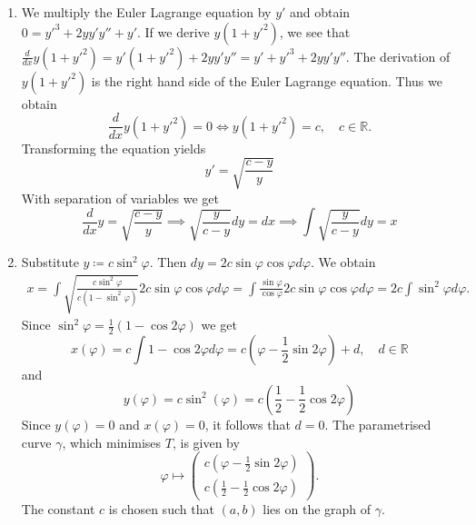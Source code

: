 \documentclass[a4paper]{article}
\theoremstyle{plain}
\begin{document}
\begin{enumerate}[label=(\alph*)]
	
	\item We multiply the Euler Lagrange equation by $y'$ and obtain $0=y'^3 + 2yy'y'' + y'$. If we derive $y(1+y'^2)$, we see that $\frac{d}{dx}y(1+y'^2) = y'(1+y'^2) + 2yy'y'' = y' + y'^3  + 2yy'y''$. The derivation of $y(1+y'^2)$ is the right hand side of the Euler Lagrange equation. Thus we obtain
	\[
		\frac{d}{dx} y(1+y'^2) = 0 \iff y(1+y'^2) = c, \quad c \in \mathbb R.
	\]
	Transforming the equation yields
	\[
		y' = \sqrt{\frac{c-y}{y}}
	\]
	With separation of variables we get
	\[
		\frac{d}{dx}y = \sqrt{\frac{c-y}{y}} \implies \sqrt{\frac{y}{c-y}} dy = dx \implies \int \sqrt{\frac{y}{c-y}}dy = x
	\]
	
	\item Substitute $y \coloneqq c \sin^2\varphi$. Then $dy = 2c\sin\varphi \cos\varphi d\varphi$. We obtain
	\begin{align*}
		x = \int \sqrt{\frac{c\sin^2\varphi}{c (1- \sin^2 \varphi)}} 2c\sin\varphi \cos\varphi d\varphi = \int \frac{\sin \varphi}{\cos\varphi}2c\sin\varphi \cos\varphi d\varphi = 2c\int \sin^2\varphi d\varphi. 
	\end{align*}
	Since $\sin^2 \varphi = \frac{1}{2}(1-\cos 2\varphi)$ we get
	\[
		x(\varphi) = c \int 1-\cos2\varphi d\varphi = c(\varphi - \frac{1}{2} \sin2\varphi) + d, \quad d \in \mathbb R
	\]
	and 
	\[
		y(\varphi) = c \sin^2(\varphi) = c(\frac{1}{2} - \frac{1}{2}\cos2\varphi)
	\]
	Since $y(\varphi) = 0$ and $x(\varphi) = 0$, it follows that $d = 0$. The parametrised curve $\gamma$, which minimises $T$,  is given by
	\[
		\varphi \mapsto \begin{pmatrix}
			c(\varphi - \frac{1}{2}\sin 2\varphi) \\
			c(\frac{1}{2} - \frac{1}{2}\cos 2\varphi)
		\end{pmatrix}.
	\]
	The constant $c$ is chosen such that $(a,b)$ lies on the graph of $\gamma$.
\end{enumerate}
\end{document}
